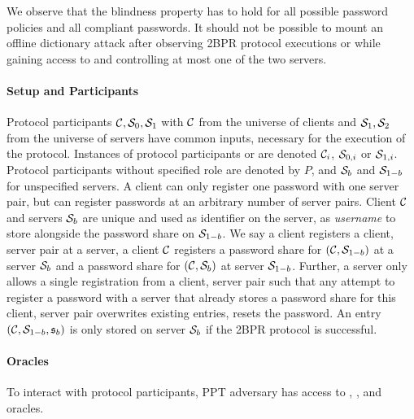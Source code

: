 We observe that the blindness property has to hold for all possible password policies and all compliant passwords. It should not be possible to mount an offline dictionary attack after observing \ac{2BPR} protocol executions or while gaining access to and controlling at most one of the two servers.

\paragraph{Setup and Participants}
Protocol participants $\mathcal{C},\mathcal{S}_0,\mathcal{S}_1$ with $\mathcal{C}$ from the universe of clients and $\mathcal{S}_1,\mathcal{S}_2$ from the universe of servers have common inputs, necessary for the execution of the protocol. %
Instances of protocol participants \Client or \Server are denoted $\mathcal{C}_i$, $\mathcal{S}_{0,i}$ or $\mathcal{S}_{1,i}$.
Protocol participants without specified role are denoted by $P$, and $\mathcal{S}_b$ and $\mathcal{S}_{1-b}$ for unspecified servers.
A client can only register one password with one server pair, but can register passwords at an arbitrary number of server pairs.
Client $\mathcal{C}$ and servers $\mathcal{S}_b$ are unique and used as identifier on the server, \ie as \emph{username} to store alongside the password share on $\mathcal{S}_{1-b}$.
We say a client registers a client, server pair at a server, \ie a client $\mathcal{C}$ registers a password share for $(\mathcal{C}, \mathcal{S}_{1-b})$ at a server $\mathcal{S}_b$ and a password share for $(\mathcal{C},\mathcal{S}_{b})$ at server $\mathcal{S}_{1-b}$.
Further, a server only allows a single registration from a client, server pair such that any attempt to register a password with a server that already stores a password share for this client, server pair overwrites existing entries, \ie resets the password.
An entry $(\mathcal{C},\mathcal{S}_{1-b},\mathfrak{s}_b)$ is only stored on server $\mathcal{S}_b$ if the \ac{2BPR} protocol is successful.

\paragraph{Oracles}
To interact with protocol participants, \ac{PPT} adversary \cA has access to \Setup, \Send, \Execute and \Corrupt oracles.

